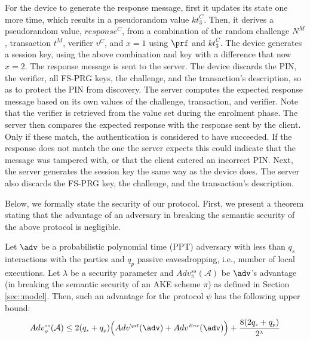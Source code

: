 \documentclass[runningheads]{llncs}
\newcommand{\sss}{\scriptscriptstyle}
\newcommand{\nonce}{\ensuremath{{N}}}
\newcommand{\keyt}{\ensuremath{{kt}}}
\newcommand{\trans}{\ensuremath{{t}}}
\renewcommand{\verifier}{\ensuremath{{v}}}
\newcommand{\VC}[1]{\ensuremath{#1^{\sss C}}}
\newcommand{\VS}[1]{\ensuremath{#1^{\sss S}}}
\newcommand{\VM}[1]{\ensuremath{#1^{\sss M}}}
\newcommand{\A}{\mathcal{A}}
\begin{document}


For the device to generate the response message, first it updates its state one more time, which results in a pseudorandom value \VC{\keyt_{\sss 3}}. Then, it derives a pseudorandom value, \VC{\mathit{response}}, from a combination of the random challenge \VM{\nonce}, transaction \VM{\trans}, verifier \VC{\verifier}, and $x=1$  using $\prf$ and \VC{\keyt_{\sss 3}}. The device generates a session key, using the above combination and key with a difference that now $x=2$. The response message is sent to the server. The device discards the PIN, the verifier, all FS-PRG keys, the challenge, and the transaction's description, so as to protect the PIN from discovery. The server computes the expected response message based on its own values of the challenge, transaction, and verifier. Note that the verifier is retrieved from the value set during the enrolment phase. The server then compares the expected response with the response sent by the client. Only if these match, the authentication is considered to have succeeded. If the response does not match the one the server expects this could indicate that the message was tampered with, or that the client entered an incorrect PIN. Next, the server generates the session key the same way as the device does.  The server also discards the FS-PRG key, the challenge, and the transaction's description.




Below, we formally state the security of our protocol.  First, we present a theorem stating that the advantage of an adversary in breaking the semantic security of the above protocol is negligible.  
\begin{theorem}[Semantic Security]
Let $\adv$ be a probabilistic polynomial time (PPT) adversary with less than $q_{\sss s}$ interactions with the parties and $q_{\sss p}$ passive eavesdropping, i.e., number of local executions. Let $\lambda$ be a security parameter and $Adv_{\sss\pi}^{\sss ss}(\A)$ be  $\adv$'s advantage (in breaking the semantic security of an AKE scheme $\pi$) as defined in Section \ref{sec::model}. Then, such an advantage for the protocol $\psi$ has the following upper bound:  
%
\vspace{-3mm}
\begin{equation*} 
Adv_{\sss \psi}^{\sss ss}(\A) \leq 2(q_{\sss s}+q_{\sss p})\Big(Adv^{\sss\prf}(\adv)+Adv^{\sss Enc}(\adv)\Big)+\frac{8(2q_{\sss s}+q_{\sss p})}{2^{\sss\lambda}}
\end{equation*}
%
\end{theorem}
\end{document}
